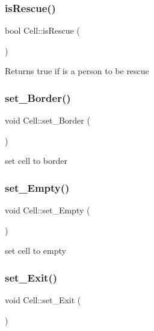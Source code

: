 \subsubsection{\texorpdfstring{is\+Rescue()}{isRescue()}}
{\footnotesize\ttfamily bool Cell\+::is\+Rescue (\begin{DoxyParamCaption}{ }\end{DoxyParamCaption})}

\begin{DoxyReturn}{Returns}
true if is a person to be rescue 
\end{DoxyReturn}
\mbox{\label{class_cell_aaf2c6b0f530432a4a2b47fbbf45c8ba0}} 
\subsubsection{\texorpdfstring{set\+\_\+\+Border()}{set\_Border()}}
{\footnotesize\ttfamily void Cell\+::set\+\_\+\+Border (\begin{DoxyParamCaption}{ }\end{DoxyParamCaption})}

set cell to border \mbox{\label{class_cell_a8e990447fa7c048d0246ee88640b5060}} 
\subsubsection{\texorpdfstring{set\+\_\+\+Empty()}{set\_Empty()}}
{\footnotesize\ttfamily void Cell\+::set\+\_\+\+Empty (\begin{DoxyParamCaption}{ }\end{DoxyParamCaption})}

set cell to empty \mbox{\label{class_cell_a0d8dcfcd6f3f40ce6179cf8fed4694ec}} 
\subsubsection{\texorpdfstring{set\+\_\+\+Exit()}{set\_Exit()}}
{\footnotesize\ttfamily void Cell\+::set\+\_\+\+Exit (\begin{DoxyParamCaption}{ }\end{DoxyParamCaption})}

